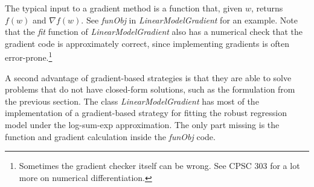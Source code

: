 \documentclass{article}
\begin{document}
The typical input to a gradient method is a function that, given $w$, returns $f(w)$ and $\nabla f(w)$. See \emph{funObj} in \emph{LinearModelGradient} for an example. Note that the \emph{fit} function of \emph{LinearModelGradient} also has a numerical check that the gradient code is approximately correct, since implementing gradients is often error-prone.\footnote{Sometimes the gradient checker itself can be wrong. See CPSC 303 for a lot more on numerical differentiation.}

A second advantage of gradient-based strategies is that they are able to solve 
problems that do not have closed-form solutions, such as the formulation from the
previous section. The class \emph{LinearModelGradient} has most of the implementation 
of a gradient-based strategy for fitting the robust regression model under the log-sum-exp approximation. 
The only part missing is the function and gradient calculation inside the \emph{funObj} code. 
\end{document}
